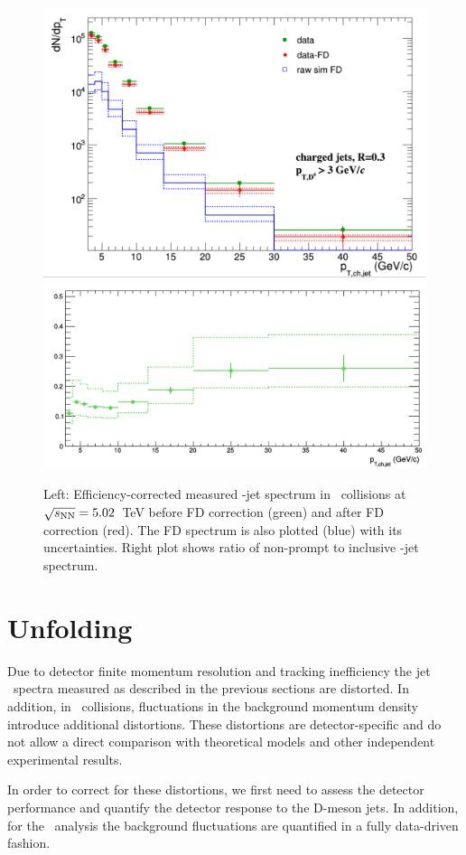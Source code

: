 \begin{figure}[bth]
\centering
\includegraphics[width=.53\textwidth]{pPbplotsD0/Simulations/JetPtSpectra_FDsub.png}
\includegraphics[width=.45\textwidth]{pPbplotsD0/Simulations/FDratio}
\caption{Left: Efficiency-corrected measured \Dzero-jet spectrum in \pPb\ collisions at $\sqrt{s_{\rm NN}}=5.02$~TeV before FD correction (green) and after FD correction (red). The FD spectrum is also plotted (blue) with its uncertainties. Right plot shows ratio of non-prompt to inclusive \Dzero-jet spectrum.}
\label{fig:pPbFD_corr_Dzero}
\end{figure}



\section{Unfolding}
\label{sect:unfResults}
Due to detector finite momentum resolution and tracking inefficiency the jet \pt\ spectra measured as described
in the previous sections are distorted. In addition, in \pPb\ collisions, fluctuations in the background momentum density
introduce additional distortions. These distortions are detector-specific and do not allow a direct comparison
with theoretical models and other independent experimental results.

In order to correct for these distortions, we first need to assess the detector performance and quantify
the detector response to the D-meson jets. In addition, for the \pPb\ analysis the background fluctuations are quantified in a
fully data-driven fashion.

